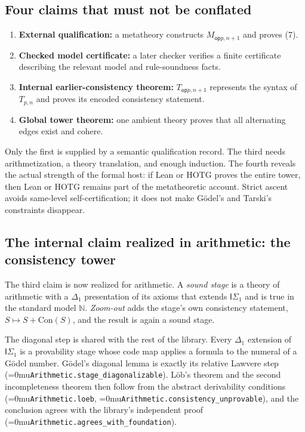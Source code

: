 \documentclass[11pt]{article}
\newcommand{\leanname}[1]{\textup{\Urlmuskip=0mu\relax\nolinkurl{#1}}}
\theoremstyle{definition}
\theoremstyle{remark}
\newcommand{\op}{\mathsf{op}}
\begin{document}
\subsection{Four claims that must not be conflated}

\begin{enumerate}
\item \textbf{External qualification:} a metatheory constructs
  $M_{\op p,n+1}$ and proves (7).
\item \textbf{Checked model certificate:} a later checker verifies a finite
  certificate describing the relevant model and rule-soundness facts.
\item \textbf{Internal earlier-consistency theorem:} $T_{\op p,n+1}$ represents
  the syntax of $T_{p,n}$ and proves its encoded consistency statement.
\item \textbf{Global tower theorem:} one ambient theory proves that all alternating
  edges exist and cohere.
\end{enumerate}

Only the first is supplied by a semantic qualification record.  The third needs
arithmetization, a theory translation, and enough induction.  The fourth reveals
the actual strength of the formal host: if Lean or HOTG proves the entire tower,
then Lean or HOTG remains part of the metatheoretic account.  Strict ascent avoids
same-level self-certification; it does not make G\"odel's and Tarski's constraints
disappear.

\subsection{The internal claim realized in arithmetic: the consistency tower}
\label{sec:consistency-tower}

The third claim is now realized for arithmetic.  A \emph{sound stage} is a
theory of arithmetic with a $\Delta_1$ presentation of its axioms that extends
$\mathsf{I}\Sigma_1$ and is true in the standard model $\mathbb N$.
\emph{Zoom-out} adds the stage's own consistency statement,
$S\mapsto S+\mathrm{Con}(S)$, and the result is again a sound stage.

The diagonal step is shared with the rest of the library.  Every $\Delta_1$
extension of $\mathsf{I}\Sigma_1$ is a provability stage whose code map applies a
formula to the numeral of a Gödel number.  Gödel's diagonal lemma is exactly its
relative Lawvere step (\leanname{Arithmetic.stage_diagonalizable}).  L\"ob's
theorem and the second incompleteness theorem then follow from the abstract
derivability conditions (\leanname{Arithmetic.loeb},
\leanname{Arithmetic.consistency_unprovable}), and the conclusion agrees with
the library's independent proof (\leanname{Arithmetic.agrees_with_foundation}).
\end{document}
